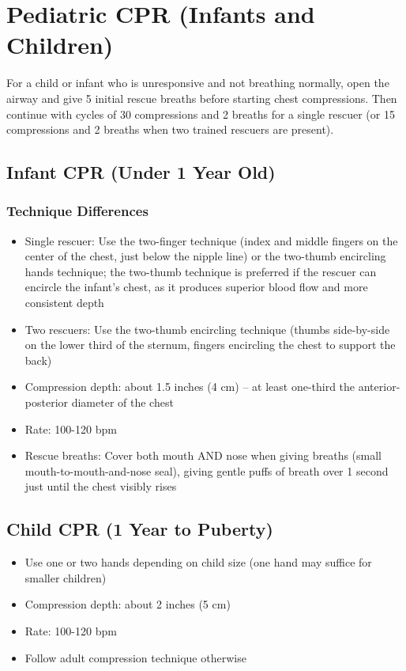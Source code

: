 \section{Pediatric CPR (Infants and Children)}

For a child or infant who is unresponsive and not breathing normally, open the
airway and give 5 initial rescue breaths before starting chest compressions.
Then continue with cycles of 30 compressions and 2 breaths for a single rescuer
(or 15 compressions and 2 breaths when two trained rescuers are present).

\subsection{Infant CPR (Under 1 Year Old)}

\subsubsection{Technique Differences}

\begin{itemize}[leftmargin=*]
  \item Single rescuer: Use the two-finger technique (index and middle fingers on the center of the chest, just below the nipple line) or the two-thumb encircling hands technique; the two-thumb technique is preferred if the rescuer can encircle the infant's chest, as it produces superior blood flow and more consistent depth \cite{ilcor_2025}
  \item Two rescuers: Use the two-thumb encircling technique (thumbs side-by-side on the lower third of the sternum, fingers encircling the chest to support the back)
  \item Compression depth: about 1.5 inches (4 cm) -- at least one-third the anterior-posterior diameter of the chest
  \item Rate: 100-120 bpm
  \item Rescue breaths: Cover both mouth AND nose when giving breaths (small mouth-to-mouth-and-nose seal), giving gentle puffs of breath over 1 second just until the chest visibly rises
\end{itemize}

\subsection{Child CPR (1 Year to Puberty)}

\begin{itemize}[leftmargin=*]
  \item Use one or two hands depending on child size (one hand may suffice for smaller children)
  \item Compression depth: about 2 inches (5 cm)
  \item Rate: 100-120 bpm
  \item Follow adult compression technique otherwise
\end{itemize}


